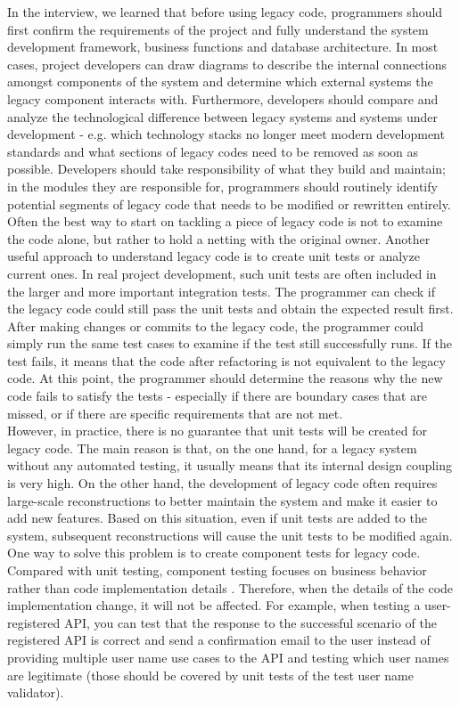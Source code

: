 \documentclass[11pt]{article}
\begin{document}
In the interview, we learned that before using legacy code, programmers should first confirm the requirements of the project and fully understand the system development framework, business functions and database architecture. In most cases, project developers can draw diagrams to describe the internal connections amongst components of the system and determine which external systems the legacy component interacts with. Furthermore, developers should compare and analyze the technological difference between legacy systems and systems under development - e.g. which technology stacks no longer meet modern development standards and what sections of legacy codes need to be removed as soon as possible. Developers should take responsibility of what they build and maintain; in the modules they are responsible for, programmers should routinely identify potential segments of legacy code that needs to be modified or rewritten entirely. Often the best way to start on tackling a piece of legacy code is not to examine the code alone, but rather to hold a netting with the original owner. Another useful approach to understand legacy code is to create unit tests or analyze current ones. In real project development, such unit tests are often included in the larger and more important integration tests. The programmer can check if the legacy code could still pass the unit tests and obtain the expected result first. After making changes or commits to the legacy code, the programmer could simply run the same test cases to examine if the test still successfully runs. If the test fails, it means that the code after refactoring is not equivalent to the legacy code. At this point, the programmer should determine the reasons why the new code fails to satisfy the tests - especially if there are boundary cases that are missed, or if there are specific requirements that are not met.\\[10px]
However, in practice, there is no guarantee that unit tests will be created for legacy code. The main reason is that, on the one hand, for a legacy system without any automated testing, it usually means that its internal design coupling is very high. On the other hand, the development of legacy code often requires large-scale reconstructions to better maintain the system and make it easier to add new features. Based on this situation, even if unit tests are added to the system, subsequent reconstructions will cause the unit tests to be modified again. One way to solve this problem is to create component tests for legacy code. Compared with unit testing, component testing focuses on business behavior rather than code implementation details \cite{no3}. Therefore, when the details of the code implementation change, it will not be affected. For example, when testing a user-registered API, you can test that the response to the successful scenario of the registered API is correct and send a confirmation email to the user instead of providing multiple user name use cases to the API and testing which user names are legitimate (those should be covered by unit tests of the test user name validator).\\[10px]
\end{document}
